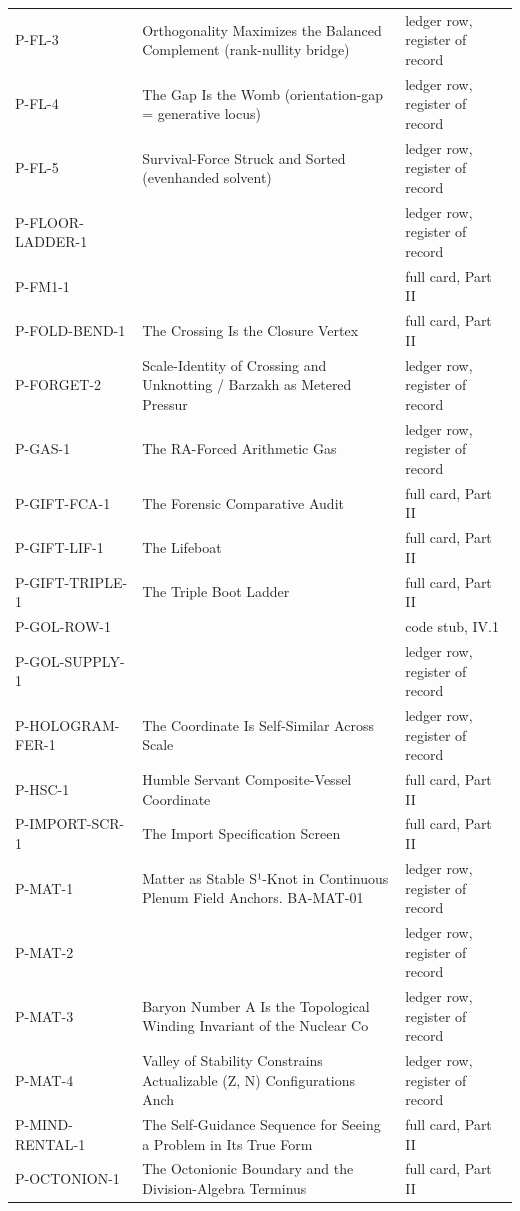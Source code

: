 \documentclass[10pt,twocolumn]{article}
\begin{document}
\begin{center}
\begin{longtable}{>{\raggedright\arraybackslash}p{}>{\raggedright\arraybackslash}p{}>{\raggedright\arraybackslash}p{}}
P-FL-3 & Orthogonality Maximizes the Balanced Complement (rank-nullity bridge) & ledger row, register of record \\
P-FL-4 & The Gap Is the Womb (orientation-gap = generative locus) & ledger row, register of record \\
P-FL-5 & Survival-Force Struck and Sorted (evenhanded solvent) & ledger row, register of record \\
P-FLOOR-LADDER-1 &  & ledger row, register of record \\
P-FM1-1 &  & full card, Part II \\
P-FOLD-BEND-1 & The Crossing Is the Closure Vertex & full card, Part II \\
P-FORGET-2 & Scale-Identity of Crossing and Unknotting / Barzakh as Metered Pressur & ledger row, register of record \\
P-GAS-1 & The RA-Forced Arithmetic Gas & ledger row, register of record \\
P-GIFT-FCA-1 & The Forensic Comparative Audit & full card, Part II \\
P-GIFT-LIF-1 & The Lifeboat & full card, Part II \\
P-GIFT-TRIPLE-1 & The Triple Boot Ladder & full card, Part II \\
P-GOL-ROW-1 &  & code stub, IV.1 \\
P-GOL-SUPPLY-1 &  & ledger row, register of record \\
P-HOLOGRAM-FER-1 & The Coordinate Is Self-Similar Across Scale & ledger row, register of record \\
P-HSC-1 & Humble Servant Composite-Vessel Coordinate & full card, Part II \\
P-IMPORT-SCR-1 & The Import Specification Screen & full card, Part II \\
P-MAT-1 & Matter as Stable S¹-Knot in Continuous Plenum Field Anchors. BA-MAT-01 & ledger row, register of record \\
P-MAT-2 &  & ledger row, register of record \\
P-MAT-3 & Baryon Number A Is the Topological Winding Invariant of the Nuclear Co & ledger row, register of record \\
P-MAT-4 & Valley of Stability Constrains Actualizable (Z, N) Configurations Anch & ledger row, register of record \\
P-MIND-RENTAL-1 & The Self-Guidance Sequence for Seeing a Problem in Its True Form & full card, Part II \\
P-OCTONION-1 & The Octonionic Boundary and the Division-Algebra Terminus & full card, Part II \\

\end{longtable}
\end{center}
\end{document}
